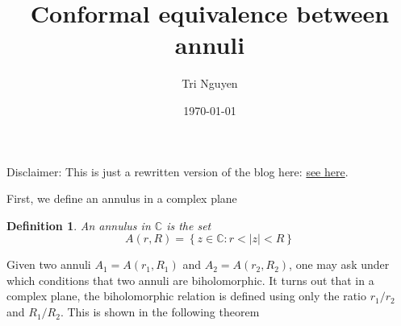 \documentclass{article} %
\title{Conformal equivalence between annuli} %
\author{Tri Nguyen} %
\date{\today} %
\newtheorem{definition}{Definition}
\begin{document}
\maketitle %
Disclaimer: This is just a rewritten version of the blog here:
\href{http://cykenleung.blogspot.com/2012/04/conformal-equivalence-of-annuli.html}{see here}.

First, we define an annulus in a complex plane
\begin{definition}
  An annulus in $\mathbb{C}$ is the set
  \[A(r,R) = \left\lbrace z \in \mathbb{C}: r < |z| <R \right\rbrace\]
\end{definition}
Given two annuli $A_1 = A(r_1, R_1)$ and $A_2 = A(r_2, R_2)$, one may ask under which conditions
that two annuli are biholomorphic. It turns out that in a complex plane, the biholomorphic relation is defined using only
the ratio $r_1/r_2$ and $R_1/R_2$. This is shown in the following theorem
\end{document}
